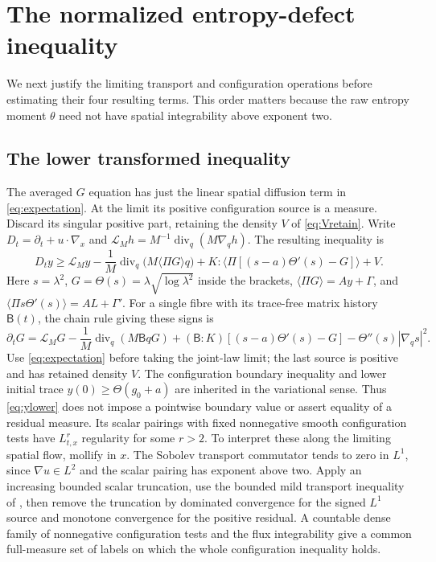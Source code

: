 \documentclass[11pt]{article}
\numberwithin{equation}{section}
\newcommand{\Div}{\operatorname{div}}
\newcommand{\grad}{\nabla}
\newcommand{\pair}[1]{\langle #1\rangle}
\begin{document}
\section{The normalized entropy-defect inequality}\label{sec:defect}
We next justify the limiting transport and configuration operations before
estimating their four resulting terms. This order matters because the raw
entropy moment $\theta$ need not have spatial integrability above exponent two.

\subsection{The lower transformed inequality}\label{subsec:lower}
The averaged $G$ equation has just the linear spatial diffusion term in
\eqref{eq:expectation}. At the limit its positive configuration source is a
measure. Discard its singular positive part, retaining the density $V$ of
\eqref{eq:Vretain}. Write $D_t=\partial_t+u\cdot\grad_x$ and
$\mathcal L_Mh=M^{-1}\Div_q(M\grad_qh)$. The resulting inequality is
\begin{equation}\label{eq:ylower}
 D_ty\geq\mathcal L_My
 -\frac1M\Div_q\bigl(M\pair{\Pi G}q\bigr)
 +K:\pair{\Pi[(s-a)\Theta'(s)-G]}+V.
\end{equation}
Here $s=\lambda^2$, $G=\Theta(s)=\lambda\sqrt{\log\lambda^2}$ inside the
brackets, $\pair{\Pi G}=Ay+\Gamma$, and
$\pair{\Pi s\Theta'(s)}=AL+\Gamma'$.
For a single fibre with its trace-free matrix history $\mathsf B(t)$, the
chain rule giving these signs is
\[
 \partial_tG=\mathcal L_MG
 -\frac1M\Div_q(M\mathsf BqG)
 +(\mathsf B:K)[(s-a)\Theta'(s)-G]
 -\Theta''(s)|\grad_qs|^2.
\]
Use \eqref{eq:expectation} before taking the joint-law limit; the last source
is positive and has retained density $V$. The configuration boundary inequality
and lower initial trace $y(0)\geq\Theta(g_0+a)$ are inherited in the
variational sense. Thus \eqref{eq:ylower} does not impose a pointwise boundary
value or assert equality of a residual measure.
Its scalar pairings with fixed nonnegative smooth configuration tests have
$L^r_{t,x}$ regularity for some $r>2$. To interpret these along the limiting
spatial flow, mollify in $x$. The Sobolev transport commutator tends to zero
in $L^1$, since $\grad u\in L^2$ and the scalar pairing has exponent above
two. Apply an increasing bounded scalar truncation, use the bounded mild
transport inequality of \cite[Proposition~A.5]{Masmoudi}, then remove the
truncation by dominated convergence for the signed $L^1$ source and monotone
convergence for the positive residual. A countable dense family of
nonnegative configuration tests and the flux integrability give a common
full-measure set of labels on which the whole configuration inequality holds.
\end{document}
